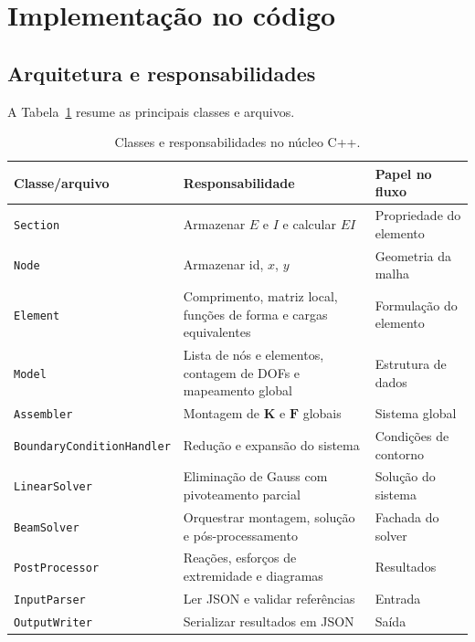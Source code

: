 \documentclass[12pt,a4paper]{article}
\begin{document}
\section{Implementação no código}
\label{sec:codigo}

\subsection{Arquitetura e responsabilidades}

A Tabela~\ref{tab:classes} resume as principais classes e arquivos.

\begin{table}[H]
  \centering
  \caption{Classes e responsabilidades no núcleo C++.}
  \label{tab:classes}
  \footnotesize
  \begin{tabular}{@{}>{\raggedright\arraybackslash}p{3.2cm}>{\raggedright\arraybackslash}p{4.5cm}>{\raggedright\arraybackslash}p{6.2cm}@{}}
    \toprule
    Classe/arquivo & Responsabilidade & Papel no fluxo \\
    \midrule
    \texttt{Section} & Armazenar \(E\) e \(I\) e calcular \(EI\) & Propriedade do elemento \\
    \texttt{Node} & Armazenar id, \(x\), \(y\) & Geometria da malha \\
    \texttt{Element} & Comprimento, matriz local, funções de forma e cargas equivalentes & Formulação do elemento \\
    \texttt{Model} & Lista de nós e elementos, contagem de DOFs e mapeamento global & Estrutura de dados \\
    \texttt{Assembler} & Montagem de \(\mathbf{K}\) e \(\mathbf{F}\) globais & Sistema global \\
    \texttt{BoundaryCondition}\newline\texttt{Handler} & Redução e expansão do sistema & Condições de contorno \\
    \texttt{LinearSolver} & Eliminação de Gauss com pivoteamento parcial & Solução do sistema \\
    \texttt{BeamSolver} & Orquestrar montagem, solução e pós-processamento & Fachada do solver \\
    \texttt{PostProcessor} & Reações, esforços de extremidade e diagramas & Resultados \\
    \texttt{InputParser} & Ler JSON e validar referências & Entrada \\
    \texttt{OutputWriter} & Serializar resultados em JSON & Saída \\
    \bottomrule
  \end{tabular}
\end{table}
\end{document}
